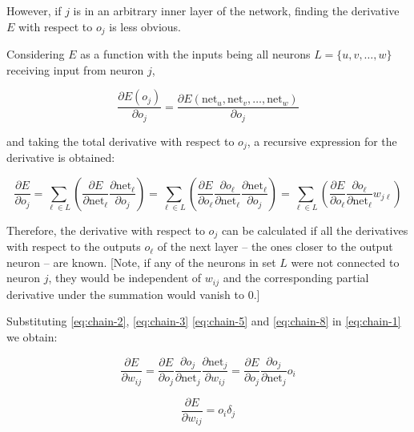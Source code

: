 However, if $j$ is in an arbitrary inner layer of the network, finding the derivative $E$ with respect to $o_{j}$ is less obvious.

Considering $E$ as a function with the inputs being all neurons $L=\{u,v,\dots ,w\}$ receiving input from neuron $j$,

\begin{equation}
    \label{eq:chain-7}
    {\frac {\partial E(o_{j})}{\partial o_{j}}}={\frac {\partial E(\mathrm {net} _{u},{\text{net}}_{v},\dots ,\mathrm {net} _{w})}{\partial o_{j}}}
\end{equation}

and taking the total derivative with respect to $o_j$, a recursive expression for the derivative is obtained:

\begin{equation}
    \label{eq:chain-8}
    {\frac {\partial E}{\partial o_{j}}}=\sum _{\ell \in L}\left({\frac {\partial E}{\partial {\text{net}}_{\ell }}}{\frac {\partial {\text{net}}_{\ell }}{\partial o_{j}}}\right)=\sum _{\ell \in L}\left({\frac {\partial E}{\partial o_{\ell }}}{\frac {\partial o_{\ell }}{\partial {\text{net}}_{\ell }}}{\frac {\partial {\text{net}}_{\ell }}{\partial o_{j}}}\right)=\sum _{\ell \in L}\left({\frac {\partial E}{\partial o_{\ell }}}{\frac {\partial o_{\ell }}{\partial {\text{net}}_{\ell }}}w_{j\ell }\right)
\end{equation}

Therefore, the derivative with respect to $o_j$ can be calculated if all the derivatives with respect to the outputs $o_{\ell }$ of the next layer – the ones closer to the output neuron – are known. [Note, if any of the neurons in set $L$ were not connected to neuron $j$, they would be independent of $w_{ij}$ and the corresponding partial derivative under the summation would vanish to 0.]

Substituting \ref{eq:chain-2}, \ref{eq:chain-3} \ref{eq:chain-5} and \ref{eq:chain-8} in \ref{eq:chain-1} we obtain:

\begin{equation}
    \label{eq:chain-9}
    {\frac {\partial E}{\partial w_{ij}}}={\frac {\partial E}{\partial o_{j}}}{\frac {\partial o_{j}}{\partial {\text{net}}_{j}}}{\frac {\partial {\text{net}}_{j}}{\partial w_{ij}}}={\frac {\partial E}{\partial o_{j}}}{\frac {\partial o_{j}}{\partial {\text{net}}_{j}}}o_{i}
\end{equation}

\begin{equation}
    \label{eq:chain-10}
    {\frac {\partial E}{\partial w_{ij}}}=o_{i}\delta _{j}
\end{equation}

